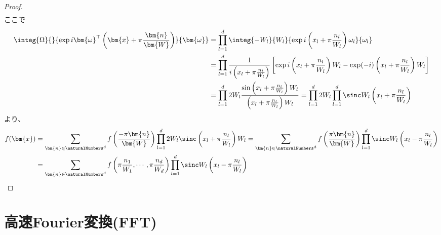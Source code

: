 \begin{proof}
\begin{align*}
				\end{align*}
				ここで
				\begin{align*}
					\integ{\Omega}{}{\exp i \bm{\omega}^\top\left(\bm{x} + \pi\frac{\bm{n}}{\bm{W}}\right) }{\bm{\omega}} &= \prod_{l=1}^d \integ{-W_l}{W_l}{\exp i\left(x_l + \pi\frac{n_l}{W_l}\right)\omega_l}{\omega_l} \\
					&= \prod_{l=1}^d \frac{1}{i\left(x_l + \pi\frac{n_l}{W_l}\right)}\left[\exp i\left(x_l + \pi\frac{n_l}{W_l}\right)W_l - \exp (-i)\left(x_l + \pi\frac{n_l}{W_l}\right)W_l\right] \\
					&= \prod_{l=1}^d 2W_l \frac{\sin \left(x_l + \pi\frac{n_l}{W_l}\right)W_l}{\left(x_l + \pi\frac{n_l}{W_l}\right)W_l} = \prod_{l=1}^d 2W_l \prod_{l=1}^d \sinc W_l\left(x_l + \pi\frac{n_l}{W_l}\right)
				\end{align*}
				より、
				\begin{align*}
					f(\bm{x}) &= \sum_{\bm{n}\in\naturalNumbers^d} f\left(\frac{-\pi\bm{n}}{\bm{W}}\right) \prod_{l=1}^d 2W_l \sinc \left(x_l + \pi\frac{n_l}{W_l}\right)W_l = \sum_{\bm{n}\in\naturalNumbers^d} f\left(\frac{\pi\bm{n}}{\bm{W}}\right) \prod_{l=1}^d \sinc W_l\left(x_l - \pi\frac{n_l}{W_l}\right) \\
					&= \sum_{\bm{n}\in\naturalNumbers^d} f\left(\pi\frac{n_1}{W_1},\cdots,\pi\frac{n_d}{W_d}\right) \prod_{l=1}^d \sinc W_l\left(x_l - \pi\frac{n_l}{W_l}\right)
				\end{align*}
			\end{proof}
		\chapter{高速Fourier変換(FFT)}
